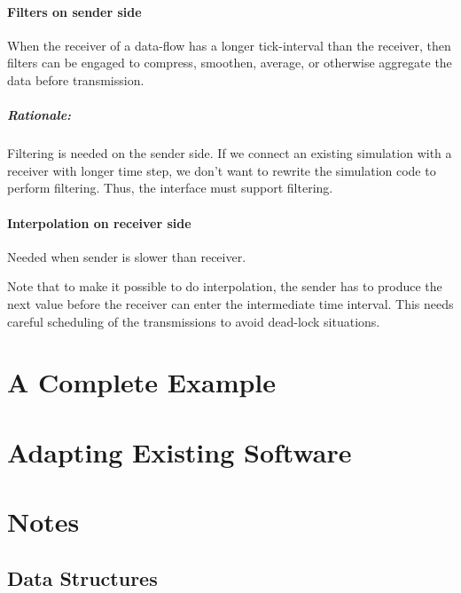 \documentclass[a4paper]{report}
\newenvironment{rationale}%
{\par\paragraph{Rationale:}}%
{\par}
\begin{document}
\subsubsection{Filters on sender side}

When the receiver of a data-flow has a longer tick-interval than the
receiver, then filters can be engaged to compress, smoothen, average,
or otherwise aggregate the data before transmission.

\begin{rationale}
  Filtering is needed on the sender side.  If we connect an existing
  simulation with a receiver with longer time step, we don't want to
  rewrite the simulation code to perform filtering.  Thus, the
  interface must support filtering.
\end{rationale}


\subsubsection{Interpolation on receiver side}

Needed when sender is slower than receiver.

Note that to make it possible to do interpolation, the sender has to
produce the next value before the receiver can enter the intermediate
time interval.  This needs careful scheduling of the transmissions to
avoid dead-lock situations.

\chapter{A Complete Example}

\chapter{Adapting Existing Software}

\chapter{Notes}

\section{Data Structures}
\end{document}
